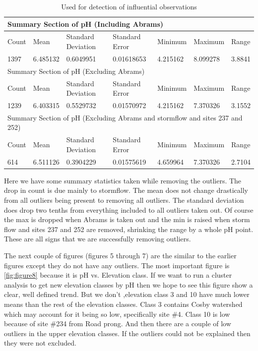 \documentclass[11pt]{article} %
\begin{document}
\begin{table}[htbp]
\caption{Used for detection of influential observations}
\begin{tabular}{lllllll}
\toprule
\multicolumn{7}{l}{Summary Section of pH (Including Abrams)}  \\ 
\midrule
Count & Mean & Standard Deviation & Standard Error & Minimum & Maximum & Range \\ 
1397 & 6.485132 &0.6049951 & 0.01618653 &4.215162 & 8.099278 & 3.8841 \\ 
\midrule
\multicolumn{7}{l}{Summary Section of pH (Excluding Abrams)} \\ 
\midrule
Count & Mean & Standard Deviation & Standard Error & Minimum & Maximum & Range \\ 
1239 & 6.403315 & 0.5529732 & 0.01570972 & 4.215162 & 7.370326 & 3.1552 \\ 
\midrule
\multicolumn{7}{l}{Summary Section of pH (Excluding Abrams and stormflow and sites 237 and 252)}\\ 
\midrule
Count & Mean & Standard Deviation & Standard Error & Minimum & Maximum & Range \\ 
614 & 6.511126 & 0.3904229 & 0.01575619 & 4.659964 &7.370326 & 2.7104 \\ 
\bottomrule
\end{tabular}
\label{Data Summary}
\end{table}


Here we have some summary statistics taken while removing the outliers.  The drop in count is due mainly to stormflow.  The mean does not change drastically from all outliers being present to removing all outliers.  The standard deviation does drop two tenths from everything included to all outliers taken out.  Of course the max is dropped when Abrams is taken out and the min is raised when storm flow and sites 237 and 252 are removed, shrinking the range by a whole pH point.  These are all signs that we are successfully removing outliers. 
	
The next couple of figures (figures 5 through 7) are the similar to the earlier figures except they do not have any outliers.  The most important figure is \autoref{fig:figure8} because it is pH vs. Elevation class.  If we want to run a cluster analysis to get new elevation classes by pH then we hope to see this figure show a clear, well defined trend.  But we don't ,elevation class 3 and 10 have much lower means than the rest of the elevation classes.  Class 3 contains Cosby watershed which may account for it being so low, specifically site $\#$4.  Class 10 is low because of site $\#$234 from Road prong.  And then there are a couple of low outliers in the upper elevation classes.  If the outliers could not be explained then they were not excluded.
\end{document}
